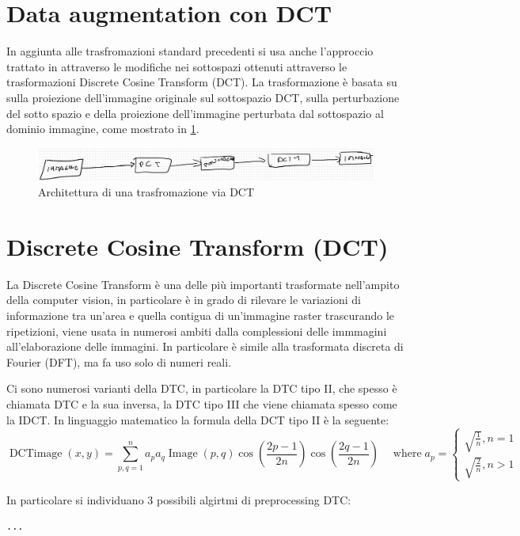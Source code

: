 \section{Data augmentation con DCT}\label{data-augmentation-con-dct}

In aggiunta alle trasfromazioni standard precedenti si usa anche l'approccio trattato in \cite{nanni_dtc_pca} attraverso le modifiche nei sottospazi ottenuti attraverso le trasformazioni Discrete Cosine
Transform (DCT). La trasformazione è basata su
sulla proiezione dell'immagine originale sul sottospazio DCT, sulla perturbazione del sotto spazio e della proiezione dell'immagine perturbata dal sottospazio al dominio immagine, come mostrato in \cref{fig:dct-schema}.

\begin{figure}[ht]
    \centering
    \includegraphics[width=1\textwidth]{data-augmentation/dct-trasformazione.PNG}
    \caption{Architettura di una trasfromazione via DCT}
    \label{fig:dct-schema}
\end{figure}


\section{Discrete Cosine Transform (DCT)}\label{discrete-cosine-transform-dct}


La Discrete Cosine Transform è una delle più importanti trasformate nell'ampito della computer vision, in particolare è in grado di rilevare le  variazioni di informazione tra un'area e quella contigua di un'immagine raster trascurando le ripetizioni, viene usata in numerosi ambiti dalla complessioni delle immmagini all'elaborazione delle immagini. In particolare è simile alla  trasformata discreta di Fourier (DFT), ma fa uso solo di numeri reali\cite{syed_dct}.

Ci sono numerosi varianti della DTC, in particolare la DTC tipo II, che spesso è chiamata DTC e la sua inversa, la DTC tipo III che viene chiamata spesso come la IDCT. In linguaggio matematico la formula della DCT tipo II è la seguente\cite{syed_dct}\cite{nanni_dtc_pca}:
\[\operatorname{DCTimage} ( x , y ) = \sum _ { p , q = 1 } ^ { n } a _ { p } a _ { q } \operatorname { Image } ( p , q ) \cos \left(\frac { 2 p - 1 } { 2 n }\right) \cos \left(\frac { 2 q - 1 } { 2 n }\right) \quad \operatorname{where}  a _ { p } = \left\{ \begin{array} { l } \sqrt { \frac { 1 } { n } } , n = 1 \\ \sqrt { \frac { 2 } { n } } , n > 1 \end{array} \right.\]

In particolare si individuano 3 possibili algirtmi di preprocessing DTC:
\begin{lstlisting}
...
\end{lstlisting}
